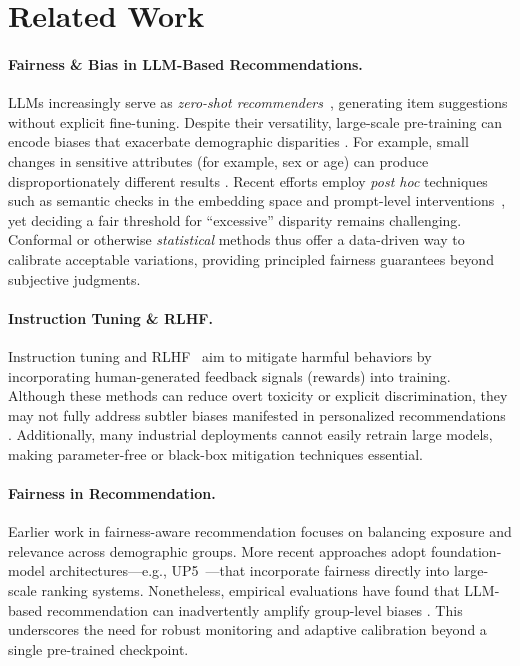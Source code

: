 \section{Related Work}
\label{sec:related_works}

\paragraph{Fairness \& Bias in LLM-Based Recommendations.}
LLMs increasingly serve as \emph{zero-shot recommenders}~\citep{hou2024large,zhang2023chatgpt}, generating item suggestions without explicit fine-tuning. Despite their versatility, large-scale pre-training can encode biases that exacerbate demographic disparities \citep{bender2021dangers}. For example, small changes in sensitive attributes (for example, sex or age) can produce disproportionately different results \citep{zhang2023chatgpt}. Recent efforts employ \emph{post hoc} techniques such as semantic checks in the embedding space \citep{lucy2021gender} and prompt-level interventions~\citep{che2023federated}, yet deciding a fair threshold for “excessive” disparity remains challenging. Conformal or otherwise \emph{statistical} methods thus offer a data-driven way to calibrate acceptable variations, providing principled fairness guarantees beyond subjective judgments.

\vspace{-1em}
\paragraph{Instruction Tuning \& RLHF.}
Instruction tuning and RLHF~\citep{ouyang2022training,bai2022training} aim to mitigate harmful behaviors by incorporating human-generated feedback signals (rewards) into training. Although these methods can reduce overt toxicity or explicit discrimination, they may not fully address subtler biases manifested in personalized recommendations \citep{sharma2023framework}. Additionally, many industrial deployments cannot easily retrain large models, making parameter-free or black-box mitigation techniques essential.

\vspace{-1em}
\paragraph{Fairness in Recommendation.}
Earlier work in fairness-aware recommendation \citep{greenwood2024user} focuses on balancing exposure and relevance across demographic groups. More recent approaches adopt foundation-model architectures—e.g., UP5~\citep{hua2023up5}—that incorporate fairness directly into large-scale ranking systems. Nonetheless, empirical evaluations have found that LLM-based recommendation can inadvertently amplify group-level biases \citep{hou2024large,zhang2023chatgpt}. This underscores the need for robust monitoring and adaptive calibration beyond a single pre-trained checkpoint.

